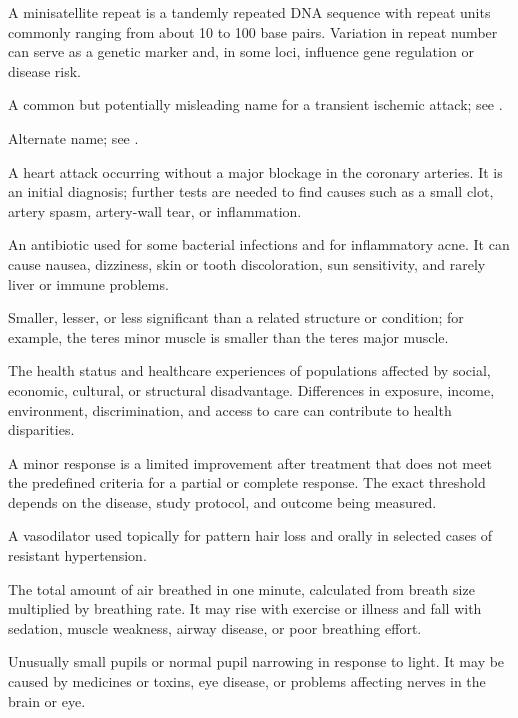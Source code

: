  A minisatellite repeat is a tandemly repeated DNA sequence with repeat units commonly ranging from about 10 to 100 base pairs. Variation in repeat number can serve as a genetic marker and, in some loci, influence gene regulation or disease risk.

 A common but potentially misleading name for a transient ischemic attack; see .

 Alternate name; see .

 A heart attack occurring without a major blockage in the coronary arteries. It is an initial diagnosis; further tests are needed to find causes such as a small clot, artery spasm, artery-wall tear, or inflammation.

 An antibiotic used for some bacterial infections and for inflammatory acne. It can cause nausea, dizziness, skin or tooth discoloration, sun sensitivity, and rarely liver or immune problems.

 Smaller, lesser, or less significant than a related structure or condition; for example, the teres minor muscle is smaller than the teres major muscle.

 The health status and healthcare experiences of populations affected by social, economic, cultural, or structural disadvantage. Differences in exposure, income, environment, discrimination, and access to care can contribute to health disparities.

 A minor response is a limited improvement after treatment that does not meet the predefined criteria for a partial or complete response. The exact threshold depends on the disease, study protocol, and outcome being measured.

 A vasodilator used topically for pattern hair loss and orally in selected cases of resistant hypertension.

 The total amount of air breathed in one minute, calculated from breath size multiplied by breathing rate. It may rise with exercise or illness and fall with sedation, muscle weakness, airway disease, or poor breathing effort.

 Unusually small pupils or normal pupil narrowing in response to light. It may be caused by medicines or toxins, eye disease, or problems affecting nerves in the brain or eye.

